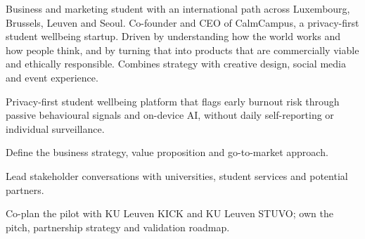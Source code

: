 \begin{minipage}[t]{\sidebarwidth}
\begin{minipage}[t]{\dimexpr\sidebarwidth-2\sidebarpadding\relax}


    \end{minipage}
\end{minipage}%
\begin{minipage}[t]{\dimexpr\mainwidth-2pt\relax}%
    \vspace{20pt}%
    \hspace{\mainpadding}%
    \begin{minipage}[t]{\dimexpr\mainwidth-2\mainpadding-2pt\relax}
        \RaggedRight




        \vspace{2pt}
        {\bodysize
        Business and marketing student with an international path across Luxembourg, Brussels, Leuven and Seoul. Co-founder and CEO of CalmCampus, a privacy-first student wellbeing startup. Driven by understanding how the world works and how people think, and by turning that into products that are commercially viable and ethically responsible. Combines strategy with creative design, social media and event experience.
        }
        \vspace{4pt}


        \begin{bullets}
            \item Privacy-first student wellbeing platform that flags early burnout risk through passive behavioural signals and on-device AI, without daily self-reporting or individual surveillance.
            \item Define the business strategy, value proposition and go-to-market approach.
            \item Lead stakeholder conversations with universities, student services and potential partners.
            \item Co-plan the pilot with KU Leuven KICK and KU Leuven STUVO; own the pitch, partnership strategy and validation roadmap.
        \end{bullets}


\end{minipage}
\end{minipage}
